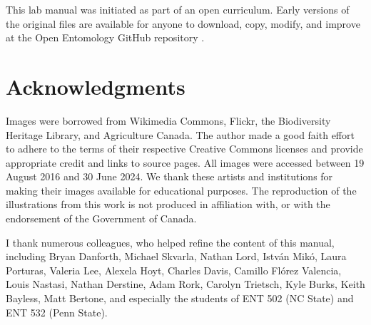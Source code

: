 This lab manual was initiated as part of an open curriculum. Early versions of the original files are available for anyone to download, copy, modify, and improve at the Open Entomology GitHub repository \citep{ENT532}.

\section*{Acknowledgments}
Images were borrowed from Wikimedia Commons, Flickr, the Biodiversity Heritage Library, and Agriculture Canada. The author made a good faith effort to adhere to the terms of their respective Creative Commons licenses and provide appropriate credit and links to source pages. All images were accessed between 19 August 2016 and 30 June 2024. We thank these artists and institutions for making their images available for educational purposes. The reproduction of the illustrations from this work is not produced in affiliation with, or with the endorsement of the Government of Canada. 

I thank numerous colleagues, who helped refine the content of this manual, including Bryan Danforth, Michael Skvarla, Nathan Lord, Istv\'an Mik\'o, Laura Porturas, Valeria Lee, Alexela Hoyt, Charles Davis, Camillo Fl\'orez Valencia, Louis Nastasi, Nathan Derstine, Adam Rork, Carolyn Trietsch, Kyle Burks, Keith Bayless, Matt Bertone, and especially the students of ENT 502 (NC State) and ENT 532 (Penn State).

\clearpage
\thispagestyle{empty}
